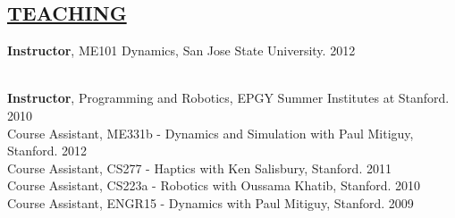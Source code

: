 \documentclass[line,margin]{res}
\newcommand{\CVOnly}[1]{}
\newcommand{\CVOnly}[1]{#1}
\begin{document}
\begin{resume}
\section{\underline{TEACHING}} 
\vspace{1.0pc}
{\bf Instructor}, ME101 Dynamics, San Jose State University\CVOnly{, 49 students}. \hfill {} \CVOnly{Fall }2012%
\CVOnly{\\[0.0pc]Student-rated 78th percentile in College of Engineering for overall teaching quality.
\\[0.0pc]{\bf Instructor}, ME101 Dynamics, San Jose State University, 56 students. \hfill Fall 2011
\\[0.0pc]Student-rated 72nd percentile in College of Engineering for overall teaching quality.}
\\[0.0pc]{\bf Instructor}, Programming and Robotics, EPGY Summer Institutes at Stanford. \hfill \CVOnly{Summer} 
2010
\\[0.4pc] Course Assistant, ME331b - Dynamics and Simulation with Paul Mitiguy, Stanford. \hfill \CVOnly{Spring} 2012
\\[0.0pc] Course Assistant, CS277 - Haptics with Ken Salisbury, Stanford. \hfill \CVOnly{Winter}
2011
\\[0.0pc] Course Assistant, CS223a - Robotics with Oussama Khatib, Stanford. \hfill \CVOnly{Winter} 
2010 
\\[0.0pc] Course Assistant, ENGR15 - Dynamics with Paul Mitiguy, Stanford. \hfill \CVOnly{Fall}
2009 
%
%

\end{resume}
\end{document}
